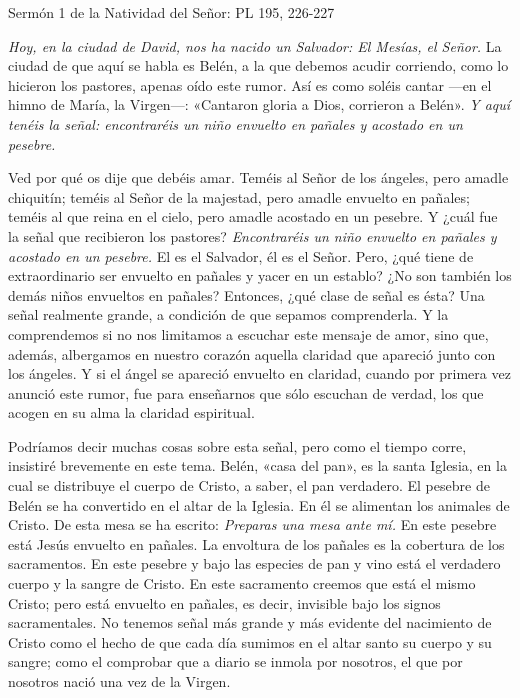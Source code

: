 \documentclass[]{article}
\begin{document}
Sermón 1 de la Natividad del Señor: PL 195, 226-227

\emph{Hoy, en la ciudad de David, nos ha nacido un Salvador: El Mesías,
el Señor.} La ciudad de que aquí se habla es Belén, a la que debemos
acudir corriendo, como lo hicieron los pastores, apenas oído este rumor.
Así es como soléis cantar ---en el himno de María, la Virgen---:
«Cantaron gloria a Dios, corrieron a Belén». \emph{Y aquí tenéis la
señal: encontraréis un niño envuelto en pañales y acostado en un
pesebre.}

Ved por qué os dije que debéis amar. Teméis al Señor de los ángeles,
pero amadle chiquitín; teméis al Señor de la majestad, pero amadle
envuelto en pañales; teméis al que reina en el cielo, pero amadle
acostado en un pesebre. Y ¿cuál fue la señal que recibieron los
pastores? \emph{Encontraréis un niño envuelto en pañales y acostado en
un pesebre.} El es el Salvador, él es el Señor. Pero, ¿qué tiene de
extraordinario ser envuelto en pañales y yacer en un establo? ¿No son
también los demás niños envueltos en pañales? Entonces, ¿qué clase de
señal es ésta? Una señal realmente grande, a condición de que sepamos
comprenderla. Y la comprendemos si no nos limitamos a escuchar este
mensaje de amor, sino que, además, albergamos en nuestro corazón aquella
claridad que apareció junto con los ángeles. Y si el ángel se apareció
envuelto en claridad, cuando por primera vez anunció este rumor, fue
para enseñarnos que sólo escuchan de verdad, los que acogen en su alma
la claridad espiritual.

Podríamos decir muchas cosas sobre esta señal, pero como el tiempo
corre, insistiré brevemente en este tema. Belén, «casa del pan», es la
santa Iglesia, en la cual se distribuye el cuerpo de Cristo, a saber, el
pan verdadero. El pesebre de Belén se ha convertido en el altar de la
Iglesia. En él se alimentan los animales de Cristo. De esta mesa se ha
escrito: \emph{Preparas una mesa ante mí.} En este pesebre está Jesús
envuelto en pañales. La envoltura de los pañales es la cobertura de los
sacramentos. En este pesebre y bajo las especies de pan y vino está el
verdadero cuerpo y la sangre de Cristo. En este sacramento creemos que
está el mismo Cristo; pero está envuelto en pañales, es decir, invisible
bajo los signos sacramentales. No tenemos señal más grande y más
evidente del nacimiento de Cristo como el hecho de que cada día sumimos
en el altar santo su cuerpo y su sangre; como el comprobar que a diario
se inmola por nosotros, el que por nosotros nació una vez de la Virgen.
\end{document}
